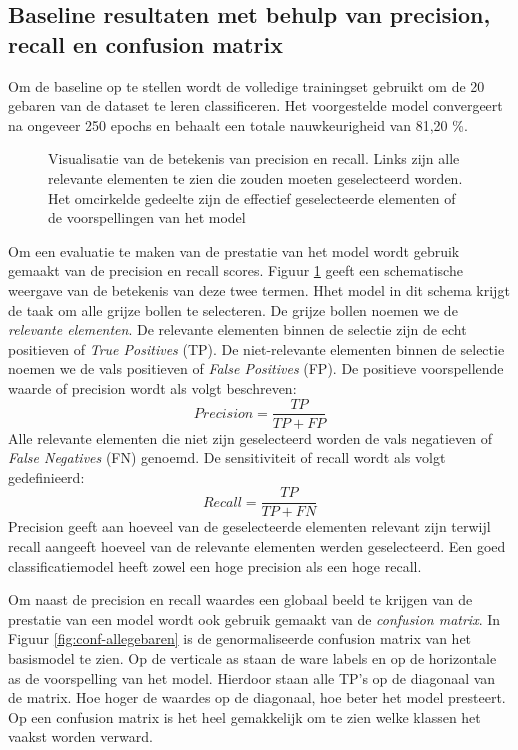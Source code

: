 \subsection{Baseline resultaten met behulp van precision, recall en confusion matrix}
Om de baseline op te stellen wordt de volledige trainingset gebruikt om de 20 gebaren van de dataset te leren classificeren. Het voorgestelde model convergeert na ongeveer 250 epochs en behaalt een totale nauwkeurigheid van 81,20 \%.

\begin{figure}[!t]
	\centering
	\def\svgwidth{0.7\columnwidth}
	
	\caption{Visualisatie van de betekenis van precision en recall. Links zijn alle relevante elementen te zien die zouden moeten geselecteerd worden. Het omcirkelde gedeelte zijn de effectief geselecteerde elementen of de voorspellingen van het model}
	\label{fig:prec+recall}
\end{figure}
\npar Om een evaluatie te maken van de prestatie van het model wordt gebruik gemaakt van de precision en recall scores. Figuur \ref{fig:prec+recall} geeft een schematische weergave van de betekenis van deze twee termen. Hhet model in dit schema krijgt de taak om alle grijze bollen te selecteren. De grijze bollen noemen we de \textit{relevante elementen}. De relevante elementen binnen de selectie zijn de echt positieven of \textit{True Positives} (TP). De niet-relevante elementen binnen de selectie noemen we de vals positieven of \textit{False Positives} (FP). De positieve voorspellende waarde of precision wordt als volgt beschreven:
\begin{equation}
Precision = \frac{TP}{TP+FP}
\end{equation}
Alle relevante elementen die niet zijn geselecteerd worden de vals negatieven of \textit{False Negatives} (FN) genoemd. De sensitiviteit of recall wordt als volgt gedefinieerd:
\begin{equation}
Recall = \frac{TP}{TP+FN}
\end{equation}
Precision geeft aan hoeveel van de geselecteerde elementen relevant zijn terwijl recall aangeeft hoeveel van de relevante elementen werden geselecteerd. Een goed classificatiemodel heeft zowel een hoge precision als een hoge recall.

\npar Om naast de precision en recall waardes een globaal beeld te krijgen van de prestatie van een model wordt ook gebruik gemaakt van de \textit{confusion matrix}. In Figuur \ref{fig:conf-allegebaren} is de genormaliseerde confusion matrix van het basismodel te zien. Op de verticale as staan de ware labels en op de horizontale as de voorspelling van het model. Hierdoor staan alle TP's op de diagonaal van de matrix. Hoe hoger de waardes op de diagonaal, hoe beter het model presteert. Op een confusion matrix is het heel gemakkelijk om te zien welke klassen het vaakst worden verward.

